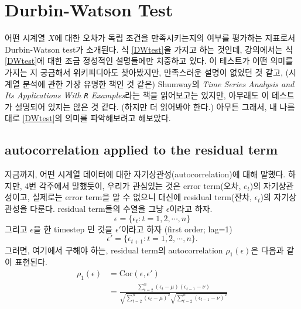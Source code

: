 \documentclass{article}
\begin{document}
\section{Durbin-Watson Test}

어떤 시계열 \(X\)에 대한 오차가 독립 조건을 만족시키는지의 여부를 평가하는 지표로서 Durbin-Watson test가 소개된다.
식 \eqref{DWtest}을 가지고 하는 것인데, 강의에서는 식 \eqref{DWtest}에 대한 조금 정성적인 설명들에만 치중하고 있다.
이 테스트가 어떤 의미를 가지는 지 궁금해서 위키피디아도 찾아봤지만, 만족스러운 설명이 없었던 것 같고, (시계열 분석에 관한 가장 유명한 책인 것 같은) Shumway의 \emph{Time Series Analysis and Its Applications With \texttt R Examples}라는 책을 읽어보고는 있지만, 아무래도 이 테스트가 설명되어 있지는 않은 것 같다.
(하지만 더 읽어봐야 한다.)
아무튼 그래서, 내 나름대로 \eqref{DWtest}의 의미를 파악해보려고 해보았다.

\subsection{autocorrelation applied to the residual term}
지금까지, 어떤 시계열 데이터에 대한 자기상관성(autocorrelation)에 대해 말했다.
하지만, 4번 각주에서 말했듯이, 우리가 관심있는 것은 error term(오차, \(e_t\))의 자기상관성이고, 실제로는 error term을 알 수 없으니 대신에 residual term(잔차, \(\epsilon_t\))의 자기상관성을 다룬다.
residual term들의 수열을 그냥 \(\epsilon\)이라고 하자.
\[\epsilon=\{\epsilon_t:t=1,2,\cdots,n\}\]
그리고 \(\epsilon\)을 한 timestep 민 것을 \(\epsilon'\)이라고 하자 (first order; lag=1)
\[\epsilon'=\{\epsilon_{t+1}:t=1,2,\cdots,n\}.\]
그러면, 여기에서 구해야 하는, residual term의 autocorrelation \(\rho_1(\epsilon)\)은  다음과 같이 표현된다.
\begin{equation}\label{autocorrelation_of_residual}
\begin{aligned}
\rho_1(\epsilon)
&=\text{Cor}(\epsilon,\epsilon')\\
&=\frac{\sum_{t=2}^n(\epsilon_t-\mu)(\epsilon_{t-1}-\nu)}{\sqrt{\sum_{t=2}^n(\epsilon_t-\mu)^2}\sqrt{\sum_{t=2}^n(\epsilon_{t-1}-\nu)^2}}
\end{aligned}
\end{equation}

\end{document}
